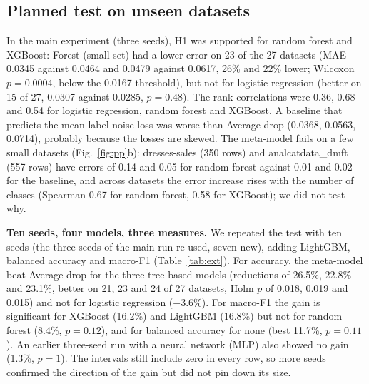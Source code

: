 \documentclass[conference]{IEEEtran}
\begin{document}
\subsection{Planned test on unseen datasets}
In the main experiment (three seeds), H1 was supported for random forest and XGBoost: Forest (small set) had a lower error on 23 of the 27 datasets (MAE 0.0345 against 0.0464 and 0.0479 against 0.0617, 26\% and 22\% lower; Wilcoxon $p=0.0004$, below the 0.0167 threshold), but not for logistic regression (better on 15 of 27, 0.0307 against 0.0285, $p=0.48$). The rank correlations were 0.36, 0.68 and 0.54 for logistic regression, random forest and XGBoost. A baseline that predicts the mean label-noise loss was worse than Average drop (0.0368, 0.0563, 0.0714), probably because the losses are skewed. The meta-model fails on a few small datasets (Fig.~\ref{fig:pp}b): dresses-sales (350 rows) and analcatdata\_dmft (557 rows) have errors of 0.14 and 0.05 for random forest against 0.01 and 0.02 for the baseline, and across datasets the error increase rises with the number of classes (Spearman 0.67 for random forest, 0.58 for XGBoost); we did not test why.

\textbf{Ten seeds, four models, three measures.} We repeated the test with ten seeds (the three seeds of the main run re-used, seven new), adding LightGBM, balanced accuracy and macro-F1 (Table~\ref{tab:ext}). For accuracy, the meta-model beat Average drop for the three tree-based models (reductions of 26.5\%, 22.8\% and 23.1\%, better on 21, 23 and 24 of 27 datasets, Holm $p$ of 0.018, 0.019 and 0.015) and not for logistic regression ($-3.6$\%). For macro-F1 the gain is significant for XGBoost (16.2\%) and LightGBM (16.8\%) but not for random forest (8.4\%, $p=0.12$), and for balanced accuracy for none (best 11.7\%, $p=0.11$). An earlier three-seed run with a neural network (MLP) also showed no gain (1.3\%, $p=1$). The intervals still include zero in every row, so more seeds confirmed the direction of the gain but did not pin down its size.
\end{document}

